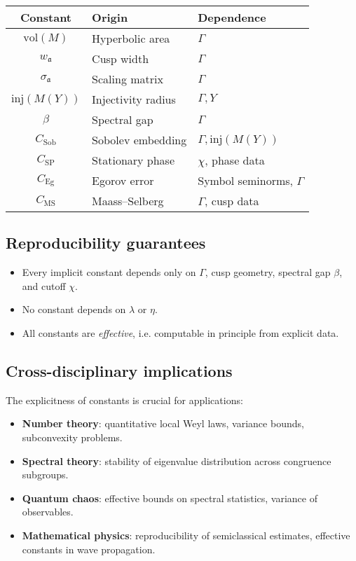 \begin{center}
\renewcommand{\arraystretch}{1.3}
\begin{tabular}{|c|l|l|}
\hline
Constant & Origin & Dependence \\
\hline
$\mathrm{vol}(M)$ & Hyperbolic area & $\Gamma$ \\
$w_\mathfrak{a}$ & Cusp width & $\Gamma$ \\
$\sigma_\mathfrak{a}$ & Scaling matrix & $\Gamma$ \\
$\mathrm{inj}(M(Y))$ & Injectivity radius & $\Gamma,Y$ \\
$\beta$ & Spectral gap & $\Gamma$ \\
$C_{\mathrm{Sob}}$ & Sobolev embedding & $\Gamma,\mathrm{inj}(M(Y))$ \\
$C_{\mathrm{SP}}$ & Stationary phase & $\chi$, phase data \\
$C_{\mathrm{Eg}}$ & Egorov error & Symbol seminorms, $\Gamma$ \\
$C_{\mathrm{MS}}$ & Maass–Selberg & $\Gamma$, cusp data \\
\hline
\end{tabular}
\end{center}

\subsection{Reproducibility guarantees} \label{subsec:7.6-repro}

\begin{itemize}
  \item Every implicit constant depends only on $\Gamma$, cusp geometry, spectral gap $\beta$, and cutoff $\chi$.
  \item No constant depends on $\lambda$ or $\eta$.
  \item All constants are \emph{effective}, i.e. computable in principle from explicit data.
\end{itemize}

\subsection{Cross-disciplinary implications} \label{subsec:7.6-cross}

The explicitness of constants is crucial for applications:
\begin{itemize}
  \item \textbf{Number theory}: quantitative local Weyl laws, variance bounds, subconvexity problems.
  \item \textbf{Spectral theory}: stability of eigenvalue distribution across congruence subgroups.
  \item \textbf{Quantum chaos}: effective bounds on spectral statistics, variance of observables.
  \item \textbf{Mathematical physics}: reproducibility of semiclassical estimates, effective constants in wave propagation.
\end{itemize}


